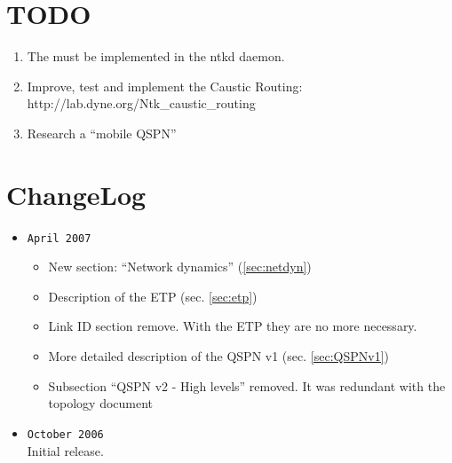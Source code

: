 \documentclass[a4paper]{article}
\newcommand{\href}[2]{ #1 }
\begin{document}
\section{TODO}
\begin{enumerate}
	\item The  must be implemented in the ntkd daemon.
	\item Improve, test and implement the Caustic Routing:
		\href{http://lab.dyne.org/Ntk\_caustic\_routing}{RFC 0013}
	\item Research a ``mobile QSPN''
\end{enumerate}

\section{ChangeLog}
\begin{itemize}
	\item \verb|April 2007|
		\begin{itemize}
			\item New section: ``Network dynamics'' (\ref{sec:netdyn})
			\item Description of the ETP (sec.  \ref{sec:etp})
			\item Link ID section remove. With the ETP they are no
				more necessary.
			\item More detailed description of the QSPN v1 (sec. \ref{sec:QSPNv1})
			\item Subsection ``QSPN v2 - High levels'' removed. It
				was redundant with the topology
				document\cite{ntktopology}
		\end{itemize}
	\item \verb|October 2006|\\
		Initial release.
\end{itemize}
\end{document}
